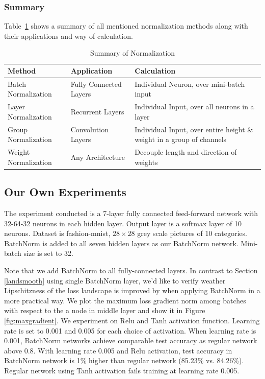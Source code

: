 \documentclass{article}
\begin{document}
\subsubsection{Summary}
Table~\ref{normsum} shows a summary of all mentioned normalization methods along with their applications and way of calculation.\\

\begingroup
\setlength{\tabcolsep}{10pt} %
\renewcommand{\arraystretch}{1.5} %
\begin{table}[h] 
\centering
 \begin{tabular}{|m{10em} | m{10em} | m{10em}|} 
 \hline
 Method & Application & Calculation\\  
 \hline
 Batch Normalization & Fully Connected Layers & Individual Neuron, over mini-batch input\\ [0.5ex] 
 \hline
 Layer Normalization & Recurrent Layers & Individual Input, over all neurons in a layer\\ [0.5ex]
 \hline
 Group Normalization & Convolution Layers & Individual Input, over entire height \& weight in a group of channels\\[0.5ex]
 \hline
 Weight Normalization & Any Architecture & Decouple length and direction of weights\\
 \hline
\end{tabular}
\caption{Summary of Normalization}
\label{normsum}
\end{table}
\endgroup

\subsection{Our Own Experiments}
The experiment conducted is a 7-layer fully connected feed-forward network with 32-64-32 neurons in each hidden layer. Output layer is a softmax layer of 10 neurons. Dataset is fashion-mnist, $28\times28$ grey scale pictures of 10 categories. BatchNorm is added to all seven hidden layers as our BatchNorm network. Mini-batch size is set to 32.

Note that we add BatchNorm to all fully-connected layers. In contrast to Section \ref{landsmooth} using single BatchNorm layer, we'd like to verify weather Lipschitzness of the loss landscape is improved by when applying BatchNorm in a more practical way. We plot the maximum loss gradient norm among batches with respect to the a node in middle layer and show it in Figure \ref{fig:maxgradient}. We experiment on Relu and Tanh activation function. Learning rate is set to 0.001 and 0.005 for each choice of activation. When learning rate is 0.001, BatchNorm networks achieve comparable test accuracy as regular network above 0.8. With learning rate 0.005 and Relu activation, test accuracy in BatchNorm network is 1\% higher than regular network (85.23\% vs. 84.26\%). Regular network using Tanh activation fails training at learning rate 0.005. 
\end{document}
